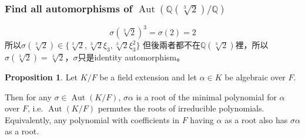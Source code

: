 \documentclass{article}
\theoremstyle{definition}
\newtheorem{prop}{Proposition}
\newcommand{\QQ}{\mathbb Q}
\DeclareMathOperator{\Aut}{Aut}
\begin{document}
\subsubsection*{Find all automorphisms of $\Aut(\QQ(\sqrt[3]{2})/\QQ)$}
\[\sigma(\sqrt[3]{2})^3=\sigma(2)=2\]
所以$\sigma(\sqrt[3]{2})\in \{\sqrt[3]{2},\sqrt[3]{2}\xi_3, \sqrt[3]{2}\xi_3^2\}$
但後兩者都不在$\QQ(\sqrt[3]{2})$裡，所以$\sigma(\sqrt[3]{2})=\sqrt[3]{2}$，$\sigma$只是identity automorphism。

\begin{prop}
	Let $K/F$ be a field extension and let $\alpha\in K$ be algebraic over $F$.

	Then for any $\sigma\in\Aut(K/F)$, $\sigma\alpha$ is a root of the minimal polynomial for $\alpha$ over $F$, 
	i.e. $\Aut(K/F)$ permutes the roots of irreducible polynomials. Equivalently, any polynomial with coefficients in $F$ having $\alpha$ as a root also has $\sigma\alpha$ as a root.
\end{prop}
\end{document}
